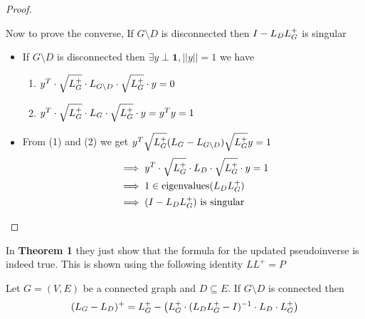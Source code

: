 \begin{proof}
\begin{itemize}
  
 \end{itemize} 

Now to prove the converse, If $G \setminus D$ is disconnected then $I - L_D \laplacian$ is singular

\begin{itemize}
 \item If $G \setminus D$ is disconnected then $\exists y \perp \textbf{1}, ||y|| = 1$ we have
    
    \begin{enumerate}
     \item $ y^T \cdot \sqlaplacian \cdot L_{G \setminus D} \cdot \sqlaplacian \cdot y = 0 \comment{(HOW)} $
     \item $ y^T \cdot \sqlaplacian \cdot L_G \cdot \sqlaplacian \cdot y = y^T y = 1 $
    \end{enumerate}
    
\item From (1) and (2) we get $y^T \sqlaplacian (L_G - L_{G \setminus D}) \sqlaplacian y= 1$
\begin{alignat}{1}
 & \implies y^T \cdot \sqlaplacian \cdot L_D \cdot \sqlaplacian \cdot y = 1 \\
 & \implies 1 \in \text{eigenvalues}(L_D\laplacian) \comment{(HOW)}\\
 & \implies (I - L_D\laplacian) \text{ is singular}
\end{alignat}

\end{itemize}




\end{proof}



In \textbf{Theorem 1} they just show that the formula for the updated pseudoinverse is indeed true. This is shown using the following identity $L L^+ = P$
\begin{HXt} 
 Let $G=(V,E)$ be a connected graph and $D \subseteq E$. If $G \setminus D$ is connected then 
$$ (L_G - L_D)^+ = \laplacian - \left( \laplacian \cdot (L_D\laplacian-I)^{-1} \cdot L_D \cdot \laplacian\right)$$
\end{HXt}


